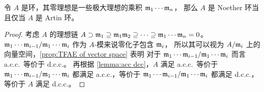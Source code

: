 \begin{corollary}
  令 $A$ 是环，其零理想是一些极大理想的乘积 $\mathfrak{m}_1\cdots\mathfrak{m}_n$，
  那么 $A$ 是 Noether 环当且仅当 $A$ 是 Artin 环。
\end{corollary}
\begin{proof}
  考虑 $A$ 的理想链 
  $A\supset\mathfrak{m}_1\supseteq\mathfrak{m}_1\mathfrak{m}_2\supseteq\cdots\supseteq \mathfrak{m}_1\cdots\mathfrak{m}_n=0$。
  $\mathfrak{m}_1\cdots\mathfrak{m}_{i-1}/\mathfrak{m}_1\cdots\mathfrak{m}_{i}$ 作为 $A$-模来说零化子包含 $\mathfrak{m}_i$，
  所以其可以视为 $A/\mathfrak{m}_i$ 上的向量空间，\autoref{prop:TFAE of vector space} 表明
  对于 $\mathfrak{m}_1\cdots\mathfrak{m}_{i-1}/\mathfrak{m}_1\cdots\mathfrak{m}_{i}$ 而言 a.c.c.\ 等价于 d.c.c.。
  再根据 \autoref{lemma:acc dcc}，$A$ 满足 a.c.c.\ 等价于 $\mathfrak{m}_1\cdots\mathfrak{m}_{i-1}/\mathfrak{m}_1\cdots\mathfrak{m}_{i}$ 都满足 a.c.c.，等价于 $\mathfrak{m}_1\cdots\mathfrak{m}_{i-1}/\mathfrak{m}_1\cdots\mathfrak{m}_{i}$ 都满足 d.c.c.，等价于 $A$ 满足 d.c.c.。
\end{proof}


